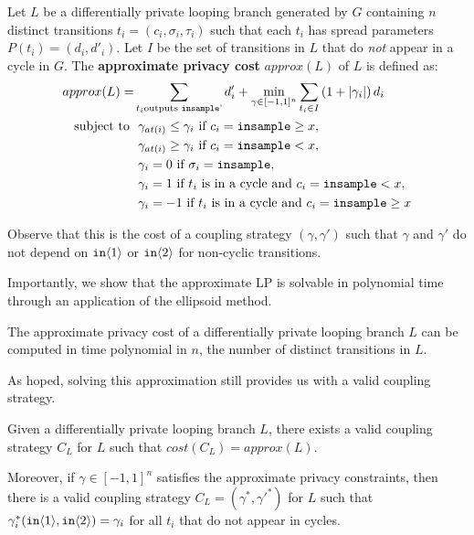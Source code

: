 \begin{defn}
    Let $L$ be a differentially private looping branch generated by $G$ containing $n$ distinct transitions $t_i = (c_i, \sigma_i, \tau_i)$ such that each $t_i$ has spread parameters $P(t_i) = (d_i, d'_i)$.
    Let $I$ be the set of transitions in $L$ that do \textit{not} appear in a cycle in $G$. The \textbf{approximate privacy cost} $approx(L)$ of $L$ is defined as:
    \begin{align*} 
        approx(L) = &\sum_{t_i \text{outputs \texttt{insample}'}} d_i' + \min_{\gamma \in [-1, 1]^n} \sum_{t_i \in I} \left(1 + |\gamma_i| \right) d_i  \\
            \text{subject to } 
            &\ \gamma_{at(i)} \leq \gamma_i \text{ if } c_i = \texttt{insample}\geq x, \\
            &\ \gamma_{at(i)} \geq \gamma_i \text{ if } c_i = \texttt{insample} < x, \\
            &\ \gamma_i = 0 \text{ if } \sigma_i = \texttt{insample}, \\
            &\ \gamma_i = 1 \text{ if } t_i \text{ is in a cycle and } c_i = \texttt{insample} < x,\\ 
            &\ \gamma_i = -1 \text{ if } t_i \text{ is in a cycle and } c_i = \texttt{insample}\geq x
    \end{align*}
\end{defn}
Observe that this is the cost of a coupling strategy $(\gamma, \gamma')$ such that $\gamma$ and $\gamma'$ do not depend on $\texttt{in}\langle1 \rangle$ or $\texttt{in}\langle2 \rangle$ for non-cyclic transitions. 

Importantly, we show that the approximate LP is solvable in polynomial time through an application of the ellipsoid method.

\begin{prop}\label{approximateSolutionPolyTimeProp}
    The approximate privacy cost of a differentially private looping branch $L$ can be computed in time polynomial in $n$, the number of distinct transitions in $L$.
\end{prop}

As hoped, solving this approximation still provides us with a valid coupling strategy.

\begin{prop}
    \label{prop:approx_exists}
    Given a differentially private looping branch $L$, there exists a valid coupling strategy $C_L$ for $L$ such that $cost(C_L) = approx(L)$.

    Moreover, if $\gamma \in [-1, 1]^n$ satisfies the approximate privacy constraints, then there is a valid coupling strategy $C_L = (\gamma^*, {\gamma'}^*)$ for $L$ such that $\gamma_i^*(\texttt{in}\langle1 \rangle, \texttt{in}\langle2 \rangle) = \gamma_i$ for all $t_i$ that do not appear in cycles. 
\end{prop}

